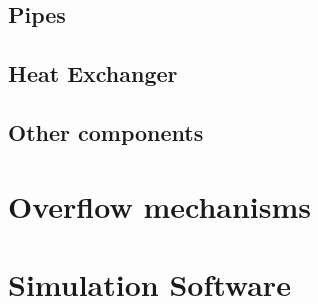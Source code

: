 \subsection{Pipes}
\subsection{Heat Exchanger}
\subsection{Other components}
\section{Overflow mechanisms}
\section{Simulation Software}

















